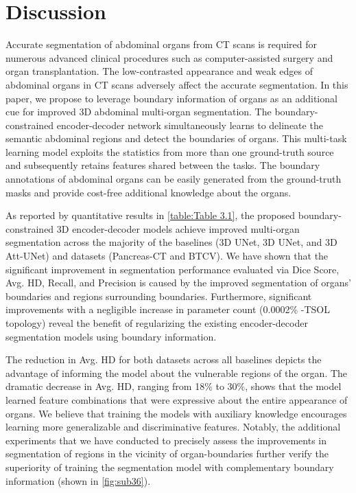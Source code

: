 \documentclass[final,5p,times,twocolumn]{elsarticle}
\begin{document}
\section{Discussion}\label{sec:discuss}
Accurate segmentation of abdominal organs from CT scans is required for numerous advanced clinical procedures such as computer-assisted surgery and organ transplantation. The low-contrasted appearance and weak edges of abdominal organs in CT scans adversely affect the accurate segmentation. In this paper, we propose to leverage boundary information of organs as an additional cue for improved 3D abdominal multi-organ segmentation. The boundary-constrained encoder-decoder network simultaneously learns to delineate the semantic abdominal regions and detect the boundaries of organs. This multi-task learning model exploits the statistics from more than one ground-truth source and subsequently retains features shared between the tasks. The boundary annotations of abdominal organs can be easily generated from the ground-truth masks and provide cost-free additional knowledge about the organs.

As reported by quantitative results in \autoref{table:Table 3.1}, the proposed boundary-constrained 3D encoder-decoder models achieve improved multi-organ segmentation across the majority of the baselines (3D UNet, 3D UNet, and 3D Att-UNet) and datasets (Pancreas-CT and BTCV). We have shown that the significant improvement in segmentation performance evaluated via Dice Score, Avg. HD, Recall, and Precision is caused by the improved segmentation of organs' boundaries and regions surrounding boundaries. Furthermore, significant improvements with a negligible increase in parameter count (0.0002\% -TSOL topology) reveal the benefit of regularizing the existing encoder-decoder segmentation models using boundary information.  

The reduction in Avg. HD for both datasets across all baselines depicts the advantage of informing the model about the vulnerable regions of the organ. The dramatic decrease in Avg. HD, ranging from 18\% to 30\%, shows that the model learned feature combinations that were expressive about the entire appearance of organs. We believe that training the models with auxiliary knowledge encourages learning more generalizable and discriminative features. Notably, the additional experiments that we have conducted to precisely assess the improvements in segmentation of regions in the vicinity of organ-boundaries further verify the superiority of training the segmentation model with complementary boundary information (shown in \autoref{fig:sub36}).
\end{document}
